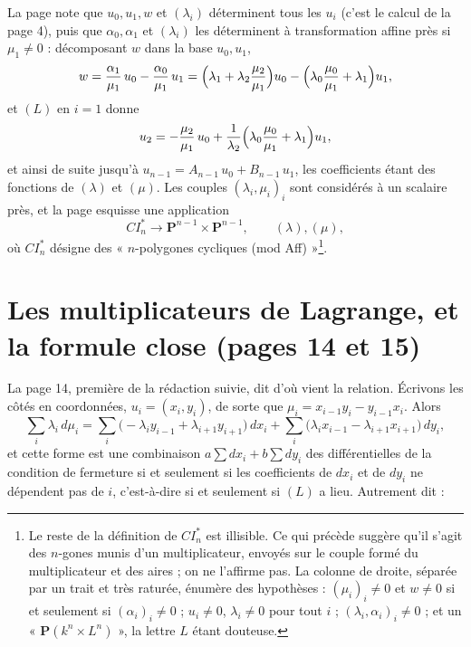 \documentclass[11pt,a4paper]{article}
\begin{document}
La page note que $u_0, u_1, w$ et $(\lambda_i)$ déterminent tous les $u_i$
(c'est le calcul de la page 4), puis que $\alpha_0, \alpha_1$ et $(\lambda_i)$
les déterminent à transformation affine près si $\mu_1 \neq 0$ : décomposant
$w$ dans la base $u_0, u_1$,
\[
  w = \frac{\alpha_1}{\mu_1}\, u_0 - \frac{\alpha_0}{\mu_1}\, u_1
  = \Bigl( \lambda_1 + \lambda_2 \frac{\mu_2}{\mu_1} \Bigr) u_0
  - \Bigl( \lambda_0 \frac{\mu_0}{\mu_1} + \lambda_1 \Bigr) u_1 ,
\]
et $(L)$ en $i = 1$ donne
\[
  u_2 = -\frac{\mu_2}{\mu_1}\, u_0 + \frac{1}{\lambda_2}
  \Bigl( \lambda_0 \frac{\mu_0}{\mu_1} + \lambda_1 \Bigr) u_1 ,
\]
et ainsi de suite jusqu'à $u_{n-1} = A_{n-1}\, u_0 + B_{n-1}\, u_1$, les
coefficients étant des fonctions de $(\lambda)$ et $(\mu)$. Les couples
$(\lambda_i, \mu_i)_i$ sont considérés à un scalaire près, et la page esquisse
une application
\[
  CI_n^* \longrightarrow \mathbf{P}^{n-1} \times \mathbf{P}^{n-1} ,
  \qquad (\lambda), (\mu) ,
\]
où $CI_n^*$ désigne des « $n$-polygones cycliques (mod Aff) »\footnote{Le
reste de la définition de $CI_n^*$ est illisible. Ce qui précède suggère qu'il
s'agit des $n$-gones munis d'un multiplicateur, envoyés sur le couple formé du
multiplicateur et des aires ; on ne l'affirme pas. La colonne de droite,
séparée par un trait et très raturée, énumère des hypothèses :
$(\mu_i)_i \neq 0$ et $w \neq 0$ si et seulement si $(\alpha_i)_i \neq 0$ ;
$u_i \neq 0$, $\lambda_i \neq 0$ pour tout $i$ ; $(\lambda_i, \alpha_i)_i \neq 0$ ;
et un « $\mathbf{P}(k^n \times L^n)$ », la lettre $L$ étant douteuse.}.

\section*{Les multiplicateurs de Lagrange, et la formule close (pages 14 et 15)}

La page 14, première de la rédaction suivie, dit d'où vient la relation.
Écrivons les côtés en coordonnées, $u_i = (x_i, y_i)$, de sorte que
$\mu_i = x_{i-1} y_i - y_{i-1} x_i$. Alors
\[
  \sum_i \lambda_i \, d\mu_i
  = \sum_i \bigl( -\lambda_i y_{i-1} + \lambda_{i+1} y_{i+1} \bigr)\, dx_i
  + \sum_i \bigl( \lambda_i x_{i-1} - \lambda_{i+1} x_{i+1} \bigr)\, dy_i ,
\]
et cette forme est une combinaison $a \sum dx_i + b \sum dy_i$ des
différentielles de la condition de fermeture si et seulement si les
coefficients de $dx_i$ et de $dy_i$ ne dépendent pas de $i$, c'est-à-dire si et
seulement si $(L)$ a lieu. Autrement dit :
\end{document}

